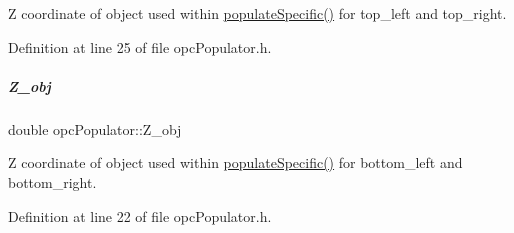 Z coordinate of object used within \hyperlink{group__opcPopulator_a0fba845edd63a15da94b864022d20ba3}{populate\+Specific()} for top\+\_\+left and top\+\_\+right. 



Definition at line 25 of file opc\+Populator.\+h.

\mbox{\label{group__opcPopulator_a5c6e50b6ea1a2112bbe8b484bee1a0b5}} 
\subparagraph{\texorpdfstring{Z\+\_\+obj}{Z\_obj}}
{\footnotesize\ttfamily double opc\+Populator\+::\+Z\+\_\+obj\hspace{0.3cm}{\ttfamily [protected]}}



Z coordinate of object used within \hyperlink{group__opcPopulator_a0fba845edd63a15da94b864022d20ba3}{populate\+Specific()} for bottom\+\_\+left and bottom\+\_\+right. 



Definition at line 22 of file opc\+Populator.\+h.

